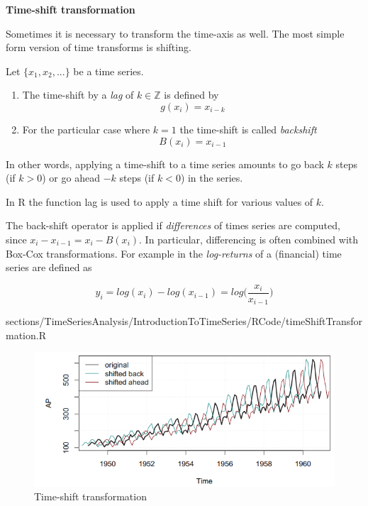 			\RTheory
			{
				\textbf{Time-shift transformation}
				
				\vfill
				
				Sometimes it is necessary to transform the time-axis as well. The most simple form version of time transforms is shifting.
				
				\vfill
				
				\hfill
				
				\break
				
				Let $\{x_1, x_2, . . . \}$ be a time series.
				
				\begin{enumerate}
					\item The time-shift by a \textit{lag} of $k \in \mathbb{Z}$ is defined by
						$$g(x_i)=x_{i-k} $$ 
					\item For the particular case where $k=1$ the time-shift is called \textit{backshift}
						$$ B(x_i)=x_{i-1}$$ 
				\end{enumerate}
				
				In other words, applying a time-shift to a time series amounts to go back $k$ steps (if $k>0$) or go ahead $-k$ steps (if $k<0$) in the series.
				
				\vfill
				
				\hfill
				
				\break
				
				In {\color{blue}R} the function {\color{blue}lag} is used to apply a time shift for various values of $k$.
				
				\vfill
				
				\hfill
				
				\break
				
				The back-shift operator is applied if \textit{differences} of times series are computed, since $x_i - x_{i-1}=x_i-B(x_i)$. In particular, differencing is often combined with Box-Cox transformations. For example in the \textit{log-returns} of a (financial) time series are defined as
					
					$$ y_i = log(x_i)-log(x_{i-1}) = log\bigg(\frac{x_i}{x_{i-1}}\bigg)$$
			
			}
			{
				sections/TimeSeriesAnalysis/IntroductionToTimeSeries/RCode/timeShiftTransformation.R
			}
			
			\begin{figure}[H]\centering
				\includegraphics[width=0.7\linewidth]{images/timeShiftTrans.png}
				\caption{Time-shift transformation}
				\label{Fig:timeShiftTrans}
			\end{figure}
			
